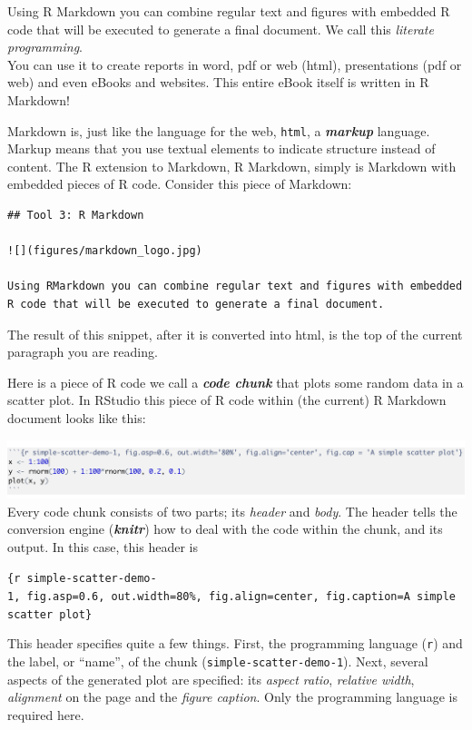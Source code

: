 \documentclass[]{book}
\begin{document}
Using R Markdown you can combine regular text and figures with embedded R code that will be executed to generate a final document. We call this \emph{literate programming}.\\
You can use it to create reports in word, pdf or web (html), presentations (pdf or web) and even eBooks and websites. This entire eBook itself is written in R Markdown!

Markdown is, just like the language for the web, \texttt{html}, a \textbf{\emph{markup}} language. Markup means that you use textual elements to indicate structure instead of content. The R extension to Markdown, R Markdown, simply is Markdown with embedded pieces of R code. Consider this piece of Markdown:

\begin{verbatim}
## Tool 3: R Markdown

![](figures/markdown_logo.jpg)

Using RMarkdown you can combine regular text and figures with embedded R code that will be executed to generate a final document. 
\end{verbatim}

The result of this snippet, after it is converted into html, is the top of the current paragraph you are reading.

Here is a piece of R code we call a \textbf{\emph{code chunk}} that plots some random data in a scatter plot. In RStudio this piece of R code within (the current) R Markdown document looks like this:

\includegraphics{figures/code_chunk.png}
Every code chunk consists of two parts; its \emph{header} and \emph{body}. The header tells the conversion engine (\textbf{\emph{knitr}}) how to deal with the code within the chunk, and its output.
In this case, this header is

\texttt{\{r\ simple-scatter-demo-1,\ fig.asp=0.6,\ out.width=\textquotesingle{}80\%\textquotesingle{},\ fig.align=\textquotesingle{}center\textquotesingle{},\ fig.caption=\textquotesingle{}A\ simple\ scatter\ plot\textquotesingle{}\}}

This header specifies quite a few things. First, the programming language (\texttt{r}) and the label, or ``name'', of the chunk (\texttt{simple-scatter-demo-1}). Next, several aspects of the generated plot are specified: its \emph{aspect ratio}, \emph{relative width}, \emph{alignment} on the page and the \emph{figure caption}. Only the programming language is required here.
\end{document}
